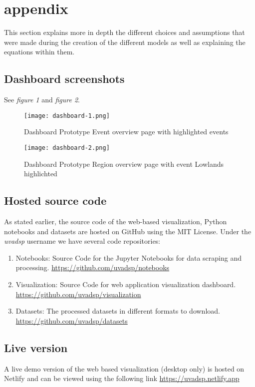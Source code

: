 \section{appendix}

This section explains more in depth the different choices and assumptions that were made during the creation of the different models as well as explaining the equations within them.

\subsection{Dashboard screenshots}

See \textit{figure 1} and \textit{figure 2}.

\begin{figure*}[!]
    \texttt{[image: dashboard-1.png]}
    \caption{Dashboard Prototype Event overview page with highlighted events}
    \label{fig:event}
\end{figure*}

\begin{figure*}[!]
    \texttt{[image: dashboard-2.png]}
    \caption{Dashboard Prototype Region overview page with event Lowlands highlichted }
    \label{fig:event}
\end{figure*}

\subsection{Hosted source code}

As stated earlier, the source code of the web-based visualization, Python notebooks and datasets are hosted on GitHub using the MIT License. Under the \textit{uvadsp} username we have several code repositories:

\begin{enumerate}
  \item Notebooks: Source Code for the Jupyter Notebooks for data scraping and processing. \underline{https://github.com/uvadsp/notebooks}
  \item Visualization: Source Code for web application visualization dashboard. \underline{https://github.com/uvadsp/visualization}
  \item Datasets: The processed datasets in different formats to download. \underline{https://github.com/uvadsp/datasets}
\end{enumerate}

\subsection{Live version}

A live demo version of the web based visualization (desktop only) is hosted on Netlify and can be viewed using the following link \underline{https://uvadsp.netlify.app}